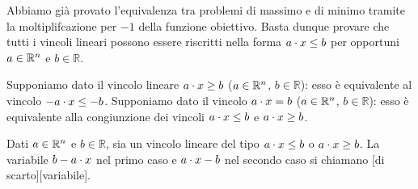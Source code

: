 \Proof Abbiamo gi\`a provato l'equivalenza tra problemi di massimo e di minimo tramite la moltiplifcazione per $-1$ della funzione obiettivo. Basta dunque provare che tutti i vincoli lineari possono essere riscritti nella forma $a \cdot x \leq b$ per opportuni $a \in \mathbb{R}^n$ e $b \in \mathbb{R}$.
\par Supponiamo dato il vincolo lineare $a \cdot x \geq b$ ($a \in \mathbb{R}^n$, $b \in \mathbb{R}$): esso \`e equivalente al vincolo $-a \cdot x \leq -b$. Supponiamo dato il vincolo $a \cdot x = b$ ($a \in \mathbb{R}^n$, $b \in \mathbb{R}$): esso \`e equivalente alla congiunzione dei vincoli $a \cdot x \leq b$ e $a \cdot x \geq b$. \EndProof
\begin{Definition}
	Dati $a \in \mathbb{R}^n$ e $b \in \mathbb{R}$, sia un vincolo lineare del tipo $a \cdot x \leq b$ o $a \cdot x \geq b$. La variabile $b - a \cdot x$ nel primo caso e $a \cdot x - b$ nel secondo caso si chiamano [di scarto][variabile].
\end{Definition}

